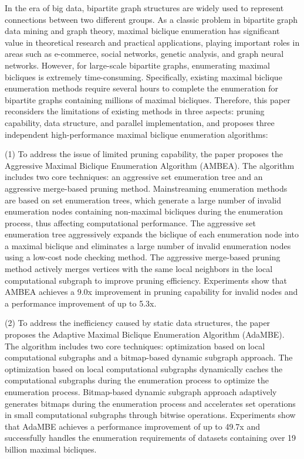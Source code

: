 In the era of big data, bipartite graph structures are widely used to represent connections between two different groups. As a classic problem in bipartite graph data mining and graph theory, maximal biclique enumeration has significant value in theoretical research and practical applications, playing important roles in areas such as e-commerce, social networks, genetic analysis, and graph neural networks. However, for large-scale bipartite graphs, enumerating maximal bicliques is extremely time-consuming. Specifically, existing maximal biclique enumeration methods require several hours to complete the enumeration for bipartite graphs containing millions of maximal bicliques. Therefore, this paper reconsiders the limitations of existing methods in three aspects: pruning capability, data structure, and parallel implementation, and proposes three independent high-performance maximal biclique enumeration algorithms:

(1) To address the issue of limited pruning capability, the paper proposes the Aggressive Maximal Biclique Enumeration Algorithm (AMBEA). The algorithm includes two core techniques: an aggressive set enumeration tree and an aggressive merge-based pruning method. Mainstreaming enumeration methods are based on set enumeration trees, which generate a large number of invalid enumeration nodes containing non-maximal bicliques during the enumeration process, thus affecting computational performance. The aggressive set enumeration tree aggressively expands the biclique of each enumeration node into a maximal biclique and eliminates a large number of invalid enumeration nodes using a low-cost node checking method. The aggressive merge-based pruning method actively merges vertices with the same local neighbors in the local computational subgraph to improve pruning efficiency. Experiments show that AMBEA achieves a 9.0x improvement in pruning capability for invalid nodes and a performance improvement of up to 5.3x.

(2) To address the inefficiency caused by static data structures, the paper proposes the Adaptive Maximal Biclique Enumeration Algorithm (AdaMBE). The algorithm includes two core techniques: optimization based on local computational subgraphs and a bitmap-based dynamic subgraph approach. The optimization based on local computational subgraphs dynamically caches the computational subgraphs during the enumeration process to optimize the enumeration process. Bitmap-based dynamic subgraph approach adaptively generates bitmaps during the enumeration process and accelerates set operations in small computational subgraphs through bitwise operations. Experiments show that AdaMBE achieves a performance improvement of up to 49.7x and successfully handles the enumeration requirements of datasets containing over 19 billion maximal bicliques.

